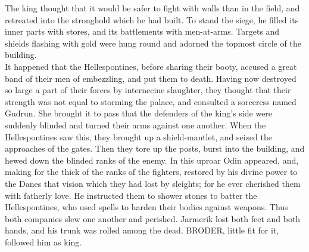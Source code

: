\documentclass[10pt,a4paper]{report}
\begin{document}
The king thought that it would be safer to fight with walls than in the field, and retreated into the stronghold which he had built. To stand the siege, he filled its inner parts with stores, and its battlements with men-at-arms. Targets and shields flashing with gold were hung round and adorned the topmost circle of the building.\\

It happened that the Hellespontines, before sharing their booty, accused a great band of their men of embezzling, and put them to death. Having now destroyed so large a part of their forces by internecine slaughter, they thought that their strength was not equal to storming the palace, and consulted a sorceress named Gudrun. She brought it to pass that the defenders of the king's side were suddenly blinded and turned their arms against one another. When the Hellespontines saw this, they brought up a shield-mantlet, and seized the approaches of the gates. Then they tore up the posts, burst into the building, and hewed down the blinded ranks of the enemy. In this uproar Odin appeared, and, making for the thick of the ranks of the fighters, restored by his divine power to the Danes that vision which they had lost by sleights; for he ever cherished them with fatherly love. He instructed them to shower stones to batter the Hellespontines, who used spells to harden their bodies against weapons. Thus both companies slew one another and perished. Jarmerik lost both feet and both hands, and his trunk was rolled among the dead. BRODER, little fit for it, followed him as king.\\
\end{document}
